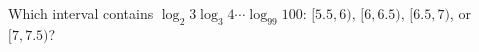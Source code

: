 Which interval contains $\log_2 3\log_3 4\cdots\log_{99}100$: $[5.5,6)$, $[6,6.5)$, $[6.5,7)$, or $[7,7.5)$?
